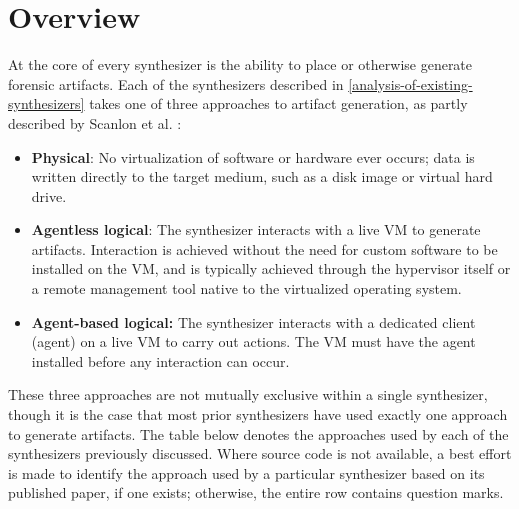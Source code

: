 \documentclass[letterpaper,12pt]{report}
\def\tightlist{}
\begin{document}
\section{Overview}\label{overview}

At the core of every synthesizer is the ability to place or otherwise
generate forensic artifacts. Each of the synthesizers described in
\autoref{analysis-of-existing-synthesizers} takes one of three approaches to artifact generation, as
partly described by Scanlon et al.
\cite{scanlonEviPlantEfficientDigital2017}:

\begin{itemize}
\tightlist
\item
  \textbf{Physical}: No virtualization of software or hardware ever
  occurs; data is written directly to the target medium, such as a disk
  image or virtual hard drive.
\item
  \textbf{Agentless logical}: The synthesizer interacts with a live VM
  to generate artifacts. Interaction is achieved without the need for
  custom software to be installed on the VM, and is typically achieved
  through the hypervisor itself or a remote management tool native to
  the virtualized operating system.
\item
  \textbf{Agent-based logical:} The synthesizer interacts with a
  dedicated client (agent) on a live VM to carry out actions. The VM
  must have the agent installed before any interaction can occur.
\end{itemize}

These three approaches are not mutually exclusive within a single
synthesizer, though it is the case that most prior synthesizers have
used exactly one approach to generate artifacts. The table below denotes
the approaches used by each of the synthesizers previously discussed.
Where source code is not available, a best effort is made to identify
the approach used by a particular synthesizer based on its published
paper, if one exists; otherwise, the entire row contains question marks.
\end{document}
